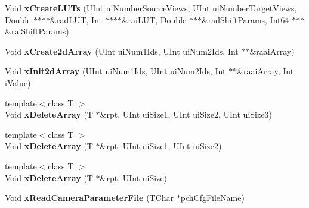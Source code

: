\begin{DoxyCompactItemize}
\item 
\mbox{\label{class_t_app_com_cam_para_ae46d48a75c84da85524edea7f280320a}} 
Void {\bfseries x\+Create\+L\+U\+Ts} (U\+Int ui\+Number\+Source\+Views, U\+Int ui\+Number\+Target\+Views, Double $\ast$$\ast$$\ast$$\ast$\&rad\+L\+UT, Int $\ast$$\ast$$\ast$$\ast$\&rai\+L\+UT, Double $\ast$$\ast$$\ast$\&rad\+Shift\+Params, Int64 $\ast$$\ast$$\ast$\&rai\+Shift\+Params)
\item 
\mbox{\label{class_t_app_com_cam_para_aa09642dc49b783bff93e04adb0de94a9}} 
Void {\bfseries x\+Create2d\+Array} (U\+Int ui\+Num1\+Ids, U\+Int ui\+Num2\+Ids, Int $\ast$$\ast$\&raai\+Array)
\item 
\mbox{\label{class_t_app_com_cam_para_a6532f8637ce03349ebaabf6d0f31b094}} 
Void {\bfseries x\+Init2d\+Array} (U\+Int ui\+Num1\+Ids, U\+Int ui\+Num2\+Ids, Int $\ast$$\ast$\&raai\+Array, Int i\+Value)
\item 
\mbox{\label{class_t_app_com_cam_para_a00d2ae7b5e3565654db5863d2ae02e5c}} 
{\footnotesize template$<$class T $>$ }\\Void {\bfseries x\+Delete\+Array} (T $\ast$\&rpt, U\+Int ui\+Size1, U\+Int ui\+Size2, U\+Int ui\+Size3)
\item 
\mbox{\label{class_t_app_com_cam_para_a1f0f1757c1c684f13c508ec5c46d2007}} 
{\footnotesize template$<$class T $>$ }\\Void {\bfseries x\+Delete\+Array} (T $\ast$\&rpt, U\+Int ui\+Size1, U\+Int ui\+Size2)
\item 
\mbox{\label{class_t_app_com_cam_para_a3aa84565608c0125645181e8c52ebae8}} 
{\footnotesize template$<$class T $>$ }\\Void {\bfseries x\+Delete\+Array} (T $\ast$\&rpt, U\+Int ui\+Size)
\item 
\mbox{\label{class_t_app_com_cam_para_abef63b0c4669e1a0c9034f5dbd400a60}} 
Void {\bfseries x\+Read\+Camera\+Parameter\+File} (T\+Char $\ast$pch\+Cfg\+File\+Name)
\item 
\mbox{\label{class_t_app_com_cam_para_a798c522b6d04164e16928e7628926f3c}} 

\end{DoxyCompactItemize}
